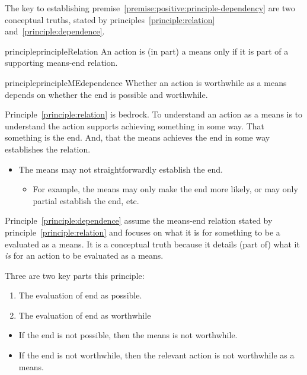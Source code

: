 \documentclass[10pt]{article}
\newcommand{\hozlinedash}[0]{%
  \noindent\hdashrule[0.5ex][c]{\textwidth}{.1pt}{2.5pt}
}
\begin{document}

\hozlinedash

The key to establishing premise~\ref{premise:positive:principle-dependency} are two conceptual truths, stated by principles~\ref{principle:relation} and~\ref{principle:dependence}.

\begin{restatable}{principle}{principleRelation}\label{principle:relation}
  An action is (in part) a means only if it is part of a supporting means-end relation.
\end{restatable}

\begin{restatable}{principle}{principleMEdependence}\label{principle:dependence}
  Whether an action is worthwhile as a means depends on whether the end is possible and worthwhile.
\end{restatable}


Principle~\ref{principle:relation} is bedrock.
To understand an action as a means is to understand the action supports achieving something in some way.
That something is the end.
And, that the means achieves the end in some way establishes the relation.
\begin{itemize}[noitemsep]
\item The means may not straightforwardly establish the end.
  \begin{itemize}[noitemsep]
  \item For example, the means may only make the end more likely, or may only partial establish the end, etc.
  \end{itemize}
\end{itemize}

Principle~\ref{principle:dependence} assume the means-end relation stated by principle~\ref{principle:relation} and focuses on what it is for something to be a evaluated as a means.
It is a conceptual truth because it details (part of) what it \emph{is} for an action to be evaluated as a means.

Three are two key parts this principle:
\begin{enumerate}
\item The evaluation of end as possible.
\item The evaluation of end as worthwhile
\end{enumerate}

\begin{itemize}
\item If the end is not possible, then the means is not worthwhile.
\item If the end is not worthwhile, then the relevant action is not worthwhile as a means.
\end{itemize}
\end{document}
